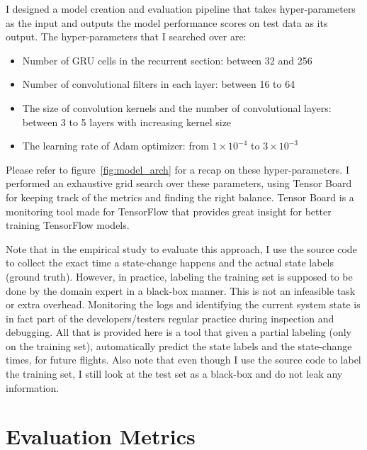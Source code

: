 I designed a model creation and evaluation pipeline that takes hyper-parameters as the input and outputs the model performance scores on test data as its output. The hyper-parameters that I searched over are:
\begin{itemize}
    \item Number of GRU cells in the recurrent section: between 32 and 256
    \item Number of convolutional filters in each layer: between 16 to 64
    \item The size of convolution kernels and the number of convolutional layers: between 3 to 5 layers with increasing kernel size
    \item The learning rate of Adam optimizer: from $1\times 10^{-4}$ to $3\times10^{-3}$
\end{itemize}
Please refer to figure~\ref{fig:model_arch} for a recap on these hyper-parameters. 
I performed an exhaustive grid search over these parameters, using Tensor Board for keeping track of the metrics and finding the right balance.
Tensor Board is a monitoring tool made for TensorFlow \cite{tensorflow2015-whitepaper} that provides great insight for better training TensorFlow models.


Note that in the empirical study to evaluate this approach, I use the source code to collect the exact time a state-change happens and the actual state labels (ground truth). However, in practice, labeling the training set is supposed to be done by the domain expert in a black-box manner. This is not an infeasible task or extra overhead. Monitoring the logs and identifying the current system state is in fact part of the developers/testers regular practice during inspection and debugging. All that is provided here is a tool that given a partial labeling (only on the training set), automatically predict the state labels and the state-change times, for future flights.  Also note that even though I use the source code to label the training set, I still look at the test set as a black-box and do not leak any information.

\section{Evaluation Metrics}
